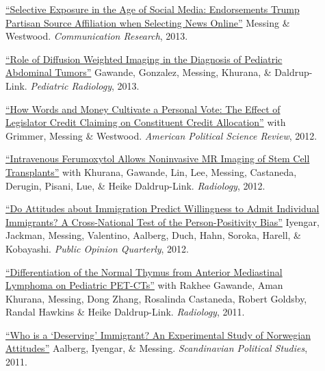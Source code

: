 \documentclass[letterpaper,11pt]{article}
\begin{document}
\begin{description}

\item[] \href{https://www.dropbox.com/s/sl847m7z7uzonro/CH3.pdf}{``Selective Exposure in the Age of Social Media: Endorsements Trump Partisan Source Affiliation when Selecting News Online''} Messing \& Westwood. 
\emph{Communication Research}, 2013.

\item[] \href{https://www.ncbi.nlm.nih.gov/pubmed/23666206}{``Role of Diffusion Weighted Imaging in the Diagnosis of Pediatric Abdominal Tumors''} Gawande, Gonzalez, Messing, Khurana, \& Daldrup-Link. 
\emph{Pediatric Radiology}, 2013.

\item[] \href{http://stanford.edu/~jgrimmer/cc.pdf}{``How Words and Money Cultivate a Personal Vote: The Effect of Legislator Credit Claiming on Constituent Credit Allocation''} with Grimmer, Messing \& Westwood.
\emph{American Political Science Review}, 2012.

\item[] \href{http://radiology.rsna.org/content/264/3/803.full.pdf+html}{``Intravenous Ferumoxytol Allows Noninvasive MR Imaging of Stem Cell Transplants''} with Khurana, Gawande, Lin, Lee, Messing, Castaneda, Derugin, Pisani, Lue, \& Heike Daldrup-Link. 
\emph{Radiology}, 2012.

\item[] \href{http://poq.oxfordjournals.org/content/early/2013/09/14/poq.nft024.full.pdf?keytype=ref&ijkey=ynq4b9uNIrXJy3I}{``Do Attitudes about Immigration Predict Willingness to Admit Individual Immigrants? A Cross-National Test of the Person-Positivity Bias''} Iyengar, Jackman, Messing, Valentino, Aalberg, Duch, Hahn, Soroka, Harell, \& Kobayashi. 
\emph{Public Opinion Quarterly}, 2012.

\item[] \href{http://radiology.rsna.org/content/early/2011/12/11/radiol.11110715.long}{``Differentiation of the Normal Thymus from Anterior Mediastinal Lymphoma on Pediatric PET-CTs''} with Rakhee Gawande, Aman Khurana, Messing, Dong Zhang, Rosalinda Castaneda, Robert Goldsby, Randal Hawkins \& Heike Daldrup-Link. 
\emph{Radiology}, 2011.

\item[] \href{http://onlinelibrary.wiley.com/doi/10.1111/j.1467-9477.2011.00280.x/abstract}{``Who is a `Deserving' Immigrant? An Experimental Study of Norwegian Attitudes''} Aalberg, Iyengar, \& Messing. 
\emph{Scandinavian Political Studies}, 2011.
\end{description}
\end{document}
